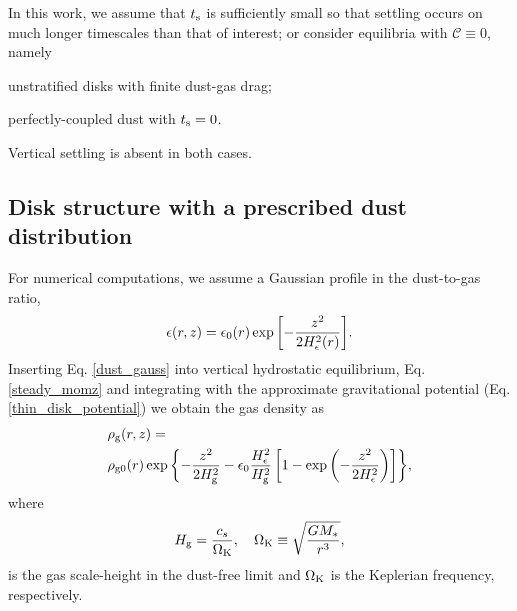 In this work, we assume that $t_\mathrm{s}$  is sufficiently small so
that settling occurs on much longer timescales  than that of interest; or
consider equilibria with $\mathcal{C}\equiv 0$, namely   
\begin{inparaenum}[1)] 
\item 
  unstratified disks with finite dust-gas drag; %
\item 
  perfectly-coupled dust with $t_\mathrm{s}=0$. %
\end{inparaenum} 
Vertical settling is absent in both cases. 


\subsection{Disk structure with a prescribed dust distribution}\label{steady_state}  
For numerical computations, we assume a Gaussian profile in the
dust-to-gas ratio,    
\begin{align}\label{dust_gauss}
  \epsilon(r,z) = \epsilon_0(r)
  \exp{\left[-\frac{z^2}{2H_\epsilon^2(r)}\right]}. 
\end{align}
Inserting Eq. \ref{dust_gauss} into vertical hydrostatic equilibrium,
Eq. \ref{steady_momz} and integrating with the approximate
gravitational potential (Eq. \ref{thin_disk_potential}) we obtain the
gas density as
\begin{align}
  &\rho_\mathrm{g}(r,z)= \notag\\
&\rho_\mathrm{g0}(r)\exp{\left\{ - \frac{z^2}{2H_\mathrm{g}^2}
    -\epsilon_0\frac{H_\epsilon^2}{H_\mathrm{g}^2}\left[1 -
      \exp{\left(-\frac{z^2}{2H_\epsilon^2}\right)}\right] \right\}}, 
\end{align}
where
\begin{align}
  H_\mathrm{g} = \frac{c_s}{\Omega_{\rm K}}, \quad \Omega_{\rm K} \equiv \sqrt{\frac{GM_*}{r^3}},   
\end{align}
is the gas scale-height in the dust-free limit and $\Omega_{\rm K}$ is the
Keplerian frequency, respectively. 

